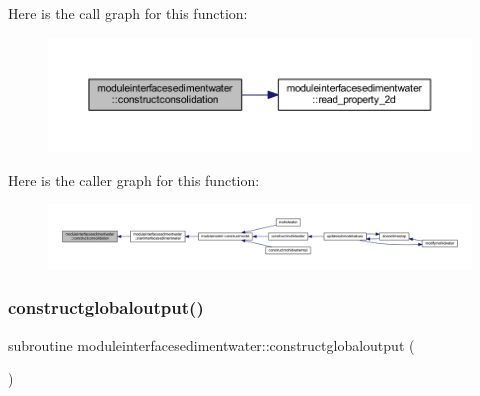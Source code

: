 Here is the call graph for this function\+:\nopagebreak
\begin{figure}[H]
\begin{center}
\leavevmode
\includegraphics[width=350pt]{namespacemoduleinterfacesedimentwater_af0c8cd28e080ee63fe3573266a390d33_cgraph}
\end{center}
\end{figure}
Here is the caller graph for this function\+:\nopagebreak
\begin{figure}[H]
\begin{center}
\leavevmode
\includegraphics[width=350pt]{namespacemoduleinterfacesedimentwater_af0c8cd28e080ee63fe3573266a390d33_icgraph}
\end{center}
\end{figure}
\mbox{\label{namespacemoduleinterfacesedimentwater_ac6a2892e7ef45d76ecf31efda1d69f96}} 
\subsubsection{\texorpdfstring{constructglobaloutput()}{constructglobaloutput()}}
{\footnotesize\ttfamily subroutine moduleinterfacesedimentwater\+::constructglobaloutput (\begin{DoxyParamCaption}{ }\end{DoxyParamCaption})\hspace{0.3cm}{\ttfamily [private]}}

